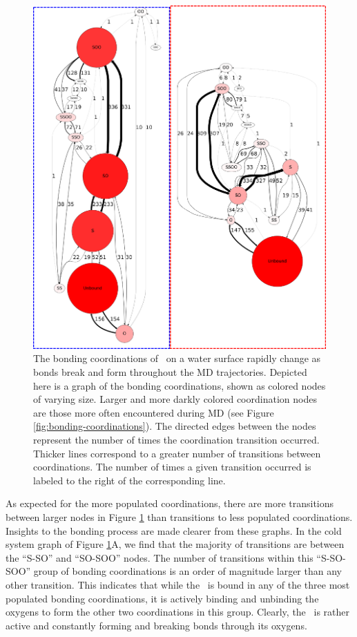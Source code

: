\documentclass{article}
\begin{document}
\begin{figure}[h!]
	\begin{center}
		\includegraphics[scale=1.0]{coordination-transitions.png}
		\caption{The bonding coordinations of \suldiox~on a water surface rapidly change as bonds break and form throughout the MD trajectories. Depicted here is a graph of the bonding coordinations, shown as colored nodes of varying size. Larger and more darkly colored coordination nodes are those more often encountered during MD (see Figure \ref{fig:bonding-coordinations}). The directed edges between the nodes represent the number of times the coordination transition occurred. Thicker lines correspond to a greater number of transitions between coordinations. The number of times a given transition occurred is labeled to the right of the corresponding line.}
		\label{fig:coordination-transitions}
	\end{center}
\end{figure}

As expected for the more populated coordinations, there are more transitions between larger nodes in Figure \ref{fig:coordination-transitions} than transitions to less populated coordinations. Insights to the bonding process are made clearer from these graphs. In the cold system graph of Figure \ref{fig:coordination-transitions}A, we find that the majority of transitions are between the ``S-SO'' and ``SO-SOO'' nodes. The number of transitions within this ``S-SO-SOO'' group of bonding coordinations is an order of magnitude larger than any other transition. This indicates that while the \suldiox~is bound in any of the three most populated bonding coordinations, it is actively binding and unbinding the oxygens to form the other two coordinations in this group. Clearly, the \suldiox~is rather active and constantly forming and breaking bonds through its oxygens.
\end{document}

